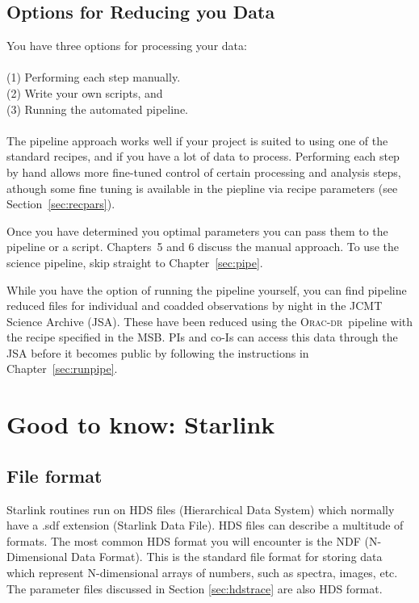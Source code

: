 \documentclass[twoside,11pt]{article}
\newcommand{\htmladdnormallink}[2]{#1}
\newcommand{\htmlref}[2]{#1}
\newcommand{\latexhtml}[2]{#1}
\newcommand{\xlabel}[1]{}
\renewcommand{\_}{\texttt{\symbol{95}}}
\newcommand{\oracdr}{\htmladdnormallink{\textsc{Orac-dr}}{http://www.oracdr.org/oracdr}}
\newcommand{\cref}[3]{\latexhtml{#1~\ref{#2}}{\htmlref{#3}{#2}}}
\begin{document}
\subsection{\xlabel{software}Options for Reducing you Data}

You have three options for processing your data:
\\\\
(1) Performing each step manually.\\
(2) Write your own scripts, and \\
(3) Running the automated pipeline.
\\\\
The pipeline approach works well if your project is suited to using one of the
standard recipes, and if you have a lot of data to process. Performing
each step by hand allows more fine-tuned control of certain
processing and analysis steps, athough some fine tuning is available in the piepline via recipe parameters (see \cref{Section}{sec:recpars}{Recipe parameters}). 

Once you have determined you optimal parameters you can pass them to the
pipeline or a script. Chapters~5 and 6 discuss the manual approach. To use the science pipeline, skip
straight to \cref{Chapter}{sec:pipe}{The ACSIS Pipeline}.

While you have the option of running the pipeline yourself, you can find pipeline reduced files for individual and coadded observations by night in the \htmladdnormallink{JCMT Science Archive}{http://www3.cadc-ccda.hia-iha.nrc-cnrc.gc.ca/jcmt/} (JSA). These have been reduced using the \oracdr\ pipeline with the recipe specified in the MSB. PIs and co-Is can access this data through the JSA before it becomes public by following the instructions in \cref{Chapter}{sec:runpipe}{The ACSIS Pipeline}.

\newpage
\section{\xlabel{starlink}Good to know: Starlink}
\label{sec:starlink}
\subsection{File format}
\label{sec:format}
Starlink routines run on HDS files (Hierarchical Data System) which normally have a .sdf extension (Starlink Data File). HDS files can describe a multitude of formats. The most common HDS format you will encounter is the NDF (N-Dimensional Data Format). This is the standard file format for storing data which represent N-dimensional arrays of numbers, such as spectra, images, etc. The parameter files discussed in Section \ref{sec:hdstrace} are also HDS format.
\end{document}
